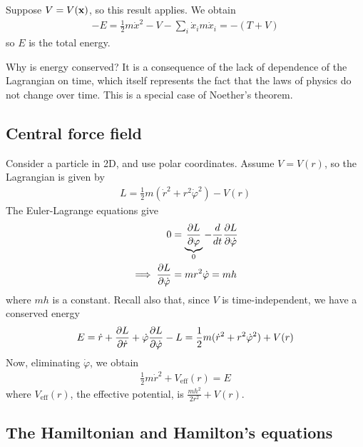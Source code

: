 \documentclass{../template/note}
\begin{document}
    \begin{example*}
        Suppose $V = V(\V x)$, so this result applies. We obtain
        \begin{align*}
            -E = \frac 1 2 m \dot x^2 - V - \sum_i \dot x_i m \dot x_i = -(T+V)
        \end{align*}
        so $E$ is the total energy.        
    \end{example*}
    
    \begin{remark*}
        Why is energy conserved? It is a consequence of the lack of dependence of the Lagrangian on time, which itself represents the fact that the laws of physics do not change over time. This is a special case of Noether's theorem.
    \end{remark*}
    
    \subsection{Central force field}
    
    Consider a particle in 2D, and use polar coordinates. Assume $V = V(r)$, so the Lagrangian is given by
    \begin{align*}
        L = \frac 1 2 m(\dot r^2 + r^2 \dot \varphi^2) - V(r)
    \end{align*}
    The Euler-Lagrange equations give
    \begin{align*}
        0 &= \underbrace{\pd{L}{\varphi}}_0 - \frac d {dt} \pd{L}{\dot \varphi} \\
        \implies \pd{L}{\dot \varphi} &= mr^2 \dot \varphi = mh
    \end{align*}
    where $mh$ is a constant. Recall also that, since $V$ is time-independent, we have a conserved energy
    \begin{align*}
        E = \dot r + \pd{L}{\dot r} + \dot \varphi \pd{L}{\dot \varphi} - L = \frac 1 2 m(\dot r^2 + r^2 \dot \varphi^2) + V(r)
    \end{align*}
    Now, eliminating $\dot \varphi$, we obtain
    \begin{align*}
        \frac 1 2 m \dot r^2 + V_\text{eff}(r) = E
    \end{align*}
    where $V_\text{eff}(r)$, the effective potential, is $\frac{mh^2}{2r^2} + V(r)$.
    
    \subsection{The Hamiltonian and Hamilton's equations}
\end{document}
